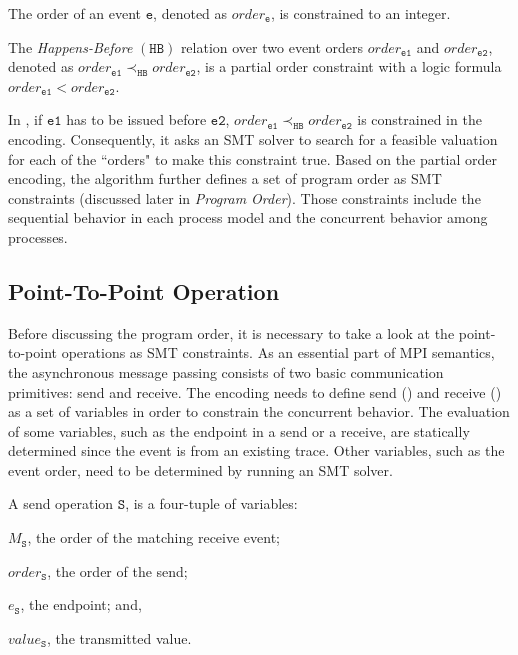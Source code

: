 \begin{definition}[Order]\label{def:order}
The order of an event $\mathtt{e}$, denoted as $\mathit{order}_\mathtt{e}$, is constrained to an integer.
\end{definition}

\begin{definition}\label{def:happens-before}
The \emph{Happens-Before} $(\mathtt{HB})$ relation over two event orders $\mathit{order}_\mathtt{e1}$ and $\mathit{order}_\mathtt{e2}$, denoted as
$\mathit{order}_\mathtt{e1} \mathrm{\prec_\mathtt{HB}} \mathit{order}_\mathtt{e2}$, is a partial order constraint with a logic formula $\mathit{order}_\mathtt{e1} <  \mathit{order}_\mathtt{e2}$. 
\label{def:hb}
\end{definition}

In , if $\mathtt{e1}$ has to be issued before $\mathtt{e2}$, $\mathit{order}_\mathtt{e1} \mathrm{\prec_\mathtt{HB}} \mathit{order}_\mathtt{e2}$ is constrained in the encoding. Consequently, it asks an SMT solver to search for a feasible valuation for each of the ``orders" to make this constraint true. Based on the partial order encoding, the algorithm further defines a set of program order as SMT constraints (discussed later in \emph{Program Order}). Those constraints include the sequential behavior in each process model and the concurrent behavior among processes. 

\subsection{Point-To-Point Operation}
Before discussing the program order, it is necessary to take a look at the point-to-point operations as SMT constraints. As an essential part of MPI semantics, the asynchronous message passing consists of two basic communication primitives: send and receive. The encoding needs to define send () and receive () as a set of variables in order to constrain the concurrent behavior. The evaluation of some variables, such as the endpoint in a send or a receive, are statically determined since the event is from an existing trace. Other variables, such as the event order, need to be determined by running an SMT solver. 
 
\begin{definition}[Send] \label{def:snd}
A send operation $\mathtt{S}$, is a four-tuple of variables:
\begin{compactenum}
\item $M_\mathtt{S}$, the order of the matching receive event;
\item $\mathit{order}_\mathtt{S}$, the order of the send;
\item $e_\mathtt{S}$, the endpoint; and,
\item $\mathit{value}_\mathtt{S}$, the transmitted value.
\end{compactenum}
\end{definition}

